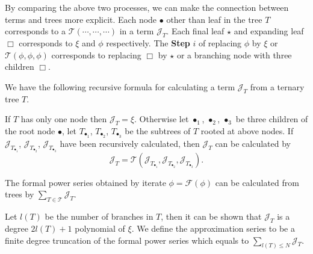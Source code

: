 \begin{itemize}
 
\end{itemize}


By comparing the above two processes, we can make the connection between terms and trees more explicit. Each node $\bullet$ other than leaf in the tree $T$ corresponds to a $\mathcal{T}(\cdots,\cdots,\cdots)$ in a term $\mathcal{J}_{T}$. Each final leaf $\star$ and expanding leaf $\Box$ corresponds to $\xi$ and $\phi$ respectively. The \textbf{Step} $i$ of replacing $\phi$ by $\xi$ or $\mathcal{T}(\phi,\phi,\phi)$ corresponds to replacing $\Box$ by $\star$ or a branching node with three children $\Box$.

We have the following recursive formula for calculating a term $\mathcal{J}_T$ from a ternary tree $T$. 

If $T$ has only one node then $\mathcal{J}_T=\xi$. Otherwise let $\bullet_1$, $\bullet_2$, $\bullet_3$ be three children of the root node $\bullet$, let $T_{\bullet_1}$, $T_{\bullet_2}$, $T_{\bullet_3}$ be the subtrees of $T$ rooted at above nodes. If $\mathcal{J}_{T_{\bullet_1}}$, $\mathcal{J}_{T_{\bullet_2}}$, $\mathcal{J}_{T_{\bullet_3}}$ have been recursively calculated, then $\mathcal{J}_T$ can be calculated by
\begin{equation}\label{eq.treeterm'.fourwave}
 \mathcal{J}_T=\mathcal{T}(\mathcal{J}_{T_{\bullet_1}}, \mathcal{J}_{T_{\bullet_2}}, \mathcal{J}_{T_{\bullet_3}}).
\end{equation}

The formal power series obtained by iterate $\phi=\mathcal{F}(\phi)$ can be calculated from trees by $\sum_{T\in \mathscr{T}} \mathcal{J}_T$.

Let $l(T)$ be the number of branches in $T$, then it can be shown that $\mathcal{J}_T$ is a degree $2l(T)+1$ polynomial of $\xi$. We define the approximation series to be a finite degree truncation of the formal power series which equals to $\sum_{l(T)\le N} \mathcal{J}_T$.

